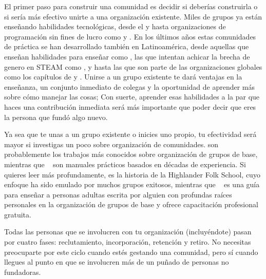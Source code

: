 El primer paso para construir una comunidad es decidir si deberías construirla
o si sería más efectivo unirte a una organización existente.
Miles de grupos ya están enseñando habilidades tecnológicas,
desde el 
y 
hasta organizaciones de programación sin fines de lucro como
y .
En los últimos años estas comunidades de práctica se han desarrollado también en Latinoamérica, desde aquellas que enseñan habilidades para enseñar como , las que intentan achicar la brecha de genero en STEAM como ,  y  hasta las que son parte de las organizaciones globales como los capítulos de  y .
Unirse a un grupo existente te dará ventajas en la enseñanza,
un conjunto inmediato de colegas
y la oportunidad de aprender más sobre cómo manejar las cosas;
Con suerte,
aprender esas habilidades a la par que haces una contribución inmediata
será más importante que poder decir que
eres la persona que fundó algo nuevo.

Ya sea que te unas a un grupo existente o inicies uno propio,
tu efectividad será mayor si investigas un poco sobre organización de comunidades.
\cite{Alin1989,Lake2018} son probablemente los trabajos más conocidos sobre organización de grupos de base,
mientras que ~\cite{Brow2007,Midw2010,Lake2018} son manuales prácticos basados en décadas de experiencia.
Si quieres leer más profundamente,
\cite{Adam1975} es la historia de la Highlander Folk School,
cuyo enfoque ha sido emulado por muchos grupos exitosos,
mientras que ~\cite{Spal2014} es una guía para enseñar a personas adultas
escrita por alguien con profundas raíces personales en la organización de grupos de base
y 
ofrece capacitación profesional gratuita.


Todas las personas que se involucren con tu organización
(incluyéndote)
pasan por cuatro fases:
reclutamiento, incorporación, retención y retiro.
No necesitas preocuparte por este ciclo cuando estés gestando una comunidad,
pero sí cuando llegues al punto en que se involucren más de un puñado de personas no fundadoras.

